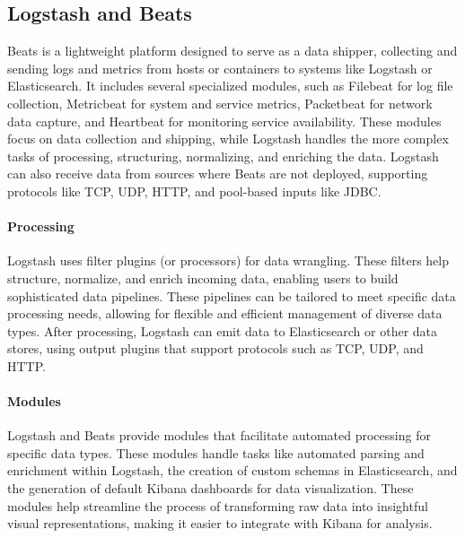 \subsection{Logstash and Beats}
Beats is a lightweight platform designed to serve as a data shipper, collecting and sending logs and metrics from hosts or containers to systems like Logstash or Elasticsearch. 
It includes several specialized modules, such as Filebeat for log file collection, Metricbeat for system and service metrics, Packetbeat for network data capture, and Heartbeat for monitoring service availability. 
These modules focus on data collection and shipping, while Logstash handles the more complex tasks of processing, structuring, normalizing, and enriching the data.
Logstash can also receive data from sources where Beats are not deployed, supporting protocols like TCP, UDP, HTTP, and pool-based inputs like JDBC.

\paragraph*{Processing}
Logstash uses filter plugins (or processors) for data wrangling. 
These filters help structure, normalize, and enrich incoming data, enabling users to build sophisticated data pipelines. 
These pipelines can be tailored to meet specific data processing needs, allowing for flexible and efficient management of diverse data types. 
After processing, Logstash can emit data to Elasticsearch or other data stores, using output plugins that support protocols such as TCP, UDP, and HTTP.

\paragraph*{Modules}
Logstash and Beats provide modules that facilitate automated processing for specific data types. 
These modules handle tasks like automated parsing and enrichment within Logstash, the creation of custom schemas in Elasticsearch, and the generation of default Kibana dashboards for data visualization.
These modules help streamline the process of transforming raw data into insightful visual representations, making it easier to integrate with Kibana for analysis.


